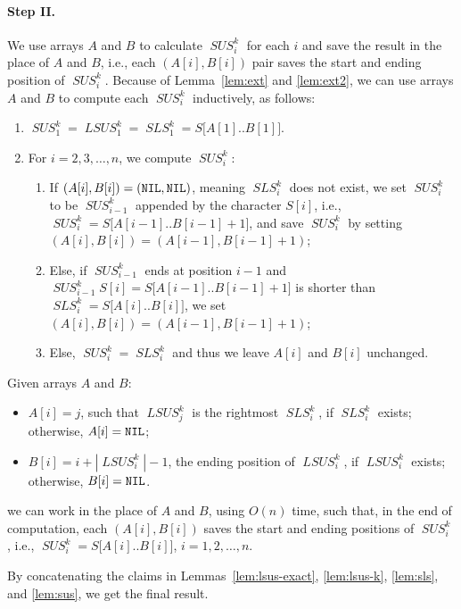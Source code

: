 \documentclass[11pt]{llncs}
\DeclareMathOperator{\sus}{\mathit{SUS}}
\DeclareMathOperator{\lsus}{\mathit{LSUS}}
\DeclareMathOperator{\sls}{\mathit{SLS}}
\begin{document}
\paragraph{Step II.} 
We use arrays $A$ and $B$ to calculate $\sus_i^k$ for each $i$
and save the result in the place of $A$ and $B$, i.e., each
$(A[i],B[i])$ pair saves the start and ending position of $\sus_i^k$.
Because of Lemma~\ref{lem:ext} and \ref{lem:ext2}, we can use arrays
$A$ and $B$ to compute each $\sus_i^k$ inductively, as follows: 
\begin{enumerate}
\item 
$\sus_1^k = \lsus_1^k = \sls_1^k = S\bigl[A[1].. B[1]\bigr]$. 
\item 
For $i=2,3,\ldots,n$, we compute $\sus_i^k$: 
\begin{enumerate}
\item 
If $(A[i],B[i]) = ({\tt NIL}, {\tt NIL})$, meaning $\sls_i^k$
does not exist, we set $\sus_i^k$ to be $\sus_{i-1}^k$ appended by the
character $S[i]$, i.e., $\sus_i^k = S\bigl[A[i-1]..
B[i-1]+1\bigr]$, and save 
$\sus_i^k$
by setting $(A[i],B[i]) = (A[i-1],B[i-1]+1)$; 
\item Else, if $\sus_{i-1}^k$ ends at position $i-1$ and 
$\sus_{i-1}^kS[i]=S\bigl[A[i-1].. B[i-1]+1\bigr]$ is shorter 
than $\sls_i^k = S\bigl[A[i].. B[i]\bigr]$, 
we set $(A[i],B[i]) = (A[i-1],B[i-1]+1)$; 
\item Else, $\sus_i^k = \sls_i^k$ and thus we leave $A[i]$
  and $B[i]$ unchanged.
\end{enumerate}
\end{enumerate}



\begin{lemma}
\label{lem:sus}  
Given arrays $A$ and $B$:
\begin{itemize}
\item 
$A[i]=j$, such that $\lsus_j^k$ is the
rightmost $\sls_i^k$, if $\sls_i^k$ exists; 
otherwise, $A[i] = {\tt NIL}$; 
\item $B[i] = i+|\lsus_i^k|-1$, the ending position of $\lsus_i^k$, if
$\lsus_i^k$ exists; otherwise, $B[i]={\tt NIL}$. 
\end{itemize}
we can work in the place of $A$ and $B$, using $O(n)$ time, 
such that, in the end of
computation, each $(A[i],B[i])$ saves the start and ending
positions of $\sus_i^k$, i.e., 
$\sus_i^k = S\bigl[A[i].. B[i]\bigr]$, $i=1,2,\ldots,n$.  
\end{lemma}

\noindent
By concatenating the claims in Lemmas~\ref{lem:lsus-exact},
\ref{lem:lsus-k}, \ref{lem:sls}, and \ref{lem:sus}, we get the
final result.
\end{document}
